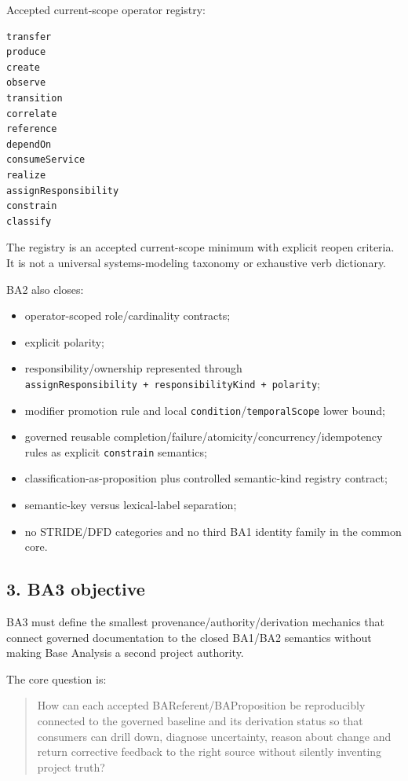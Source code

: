 \documentclass[11pt,a4paper]{article}
\providecommand{\tightlist}{\setlength{\itemsep}{0pt}\setlength{\parskip}{0pt}}
\begin{document}
Accepted current-scope operator registry:

\begin{verbatim}
transfer
produce
create
observe
transition
correlate
reference
dependOn
consumeService
realize
assignResponsibility
constrain
classify
\end{verbatim}

The registry is an accepted current-scope minimum with explicit reopen criteria. It is not a universal systems-modeling taxonomy or exhaustive verb dictionary.

BA2 also closes:

\begin{itemize}
\tightlist
\item
  operator-scoped role/cardinality contracts;
\item
  explicit polarity;
\item
  responsibility/ownership represented through \texttt{assignResponsibility\ +\ responsibilityKind\ +\ polarity};
\item
  modifier promotion rule and local \texttt{condition}/\texttt{temporalScope} lower bound;
\item
  governed reusable completion/failure/atomicity/concurrency/idempotency rules as explicit \texttt{constrain} semantics;
\item
  classification-as-proposition plus controlled semantic-kind registry contract;
\item
  semantic-key versus lexical-label separation;
\item
  no STRIDE/DFD categories and no third BA1 identity family in the common core.
\end{itemize}

\subsection{3. BA3 objective}\label{ba3-objective}

BA3 must define the smallest provenance/authority/derivation mechanics that connect governed documentation to the closed BA1/BA2 semantics without making Base Analysis a second project authority.

The core question is:

\begin{quote}
How can each accepted BAReferent/BAProposition be reproducibly connected to the governed baseline and its derivation status so that consumers can drill down, diagnose uncertainty, reason about change and return corrective feedback to the right source without silently inventing project truth?
\end{quote}
\end{document}
